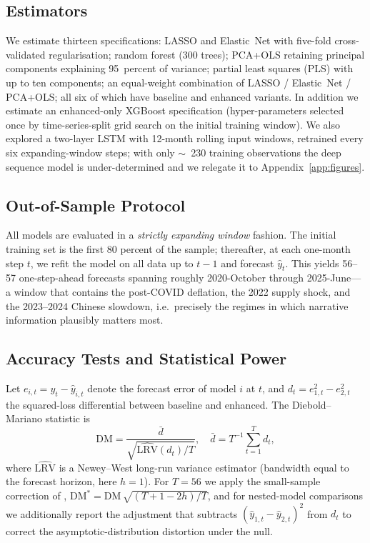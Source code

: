 \documentclass[AER]{AEA}
\begin{document}
\subsection{Estimators}
We estimate thirteen specifications: LASSO and Elastic~Net with five-fold
cross-validated regularisation; random forest (300 trees); PCA+OLS
retaining principal components explaining 95~percent of variance; partial
least squares (PLS) with up to ten components; an equal-weight combination
of LASSO / Elastic~Net / PCA+OLS; all six of which have baseline and
enhanced variants. In addition we estimate an enhanced-only XGBoost specification
(hyper-parameters selected once by time-series-split grid search on the
initial training window). We also explored a two-layer LSTM with 12-month
rolling input windows, retrained every six expanding-window steps; with
only $\sim$~230 training observations the deep sequence model is
under-determined and we relegate it to Appendix~\ref{app:figures}.

\subsection{Out-of-Sample Protocol}
All models are evaluated in a \emph{strictly expanding window} fashion.
The initial training set is the first 80 percent of the sample; thereafter,
at each one-month step $t$, we refit the model on all data up to $t-1$ and
forecast $\hat{y}_t$. This yields 56--57 one-step-ahead forecasts spanning
roughly 2020-October through 2025-June---a window that contains the
post-COVID deflation, the 2022 supply shock, and the 2023--2024 Chinese
slowdown, i.e.~precisely the regimes in which narrative information
plausibly matters most.

\subsection{Accuracy Tests and Statistical Power}
Let $e_{i,t} = y_t - \hat{y}_{i,t}$ denote the forecast error of model $i$
at $t$, and $d_t = e_{1,t}^2 - e_{2,t}^2$ the squared-loss differential
between baseline and enhanced. The Diebold--Mariano statistic is
\begin{equation}
\mathrm{DM} = \frac{\bar{d}}{\sqrt{\widehat{\mathrm{LRV}}(d_t)/T}},
\quad \bar{d}=T^{-1}\sum_{t=1}^{T} d_t,
\label{eq:dm}
\end{equation}
where $\widehat{\mathrm{LRV}}$ is a Newey--West long-run variance estimator
(bandwidth equal to the forecast horizon, here $h=1$). For $T=56$ we apply
the small-sample correction of \citet{harvey1997testing},
$\mathrm{DM}^{*} = \mathrm{DM}\,\sqrt{(T+1-2h)/T}$, and for nested-model
comparisons we additionally report the \citet{clark2007approximately}
adjustment that subtracts $(\hat{y}_{1,t}-\hat{y}_{2,t})^2$ from $d_t$ to
correct the asymptotic-distribution distortion under the null.
\end{document}
